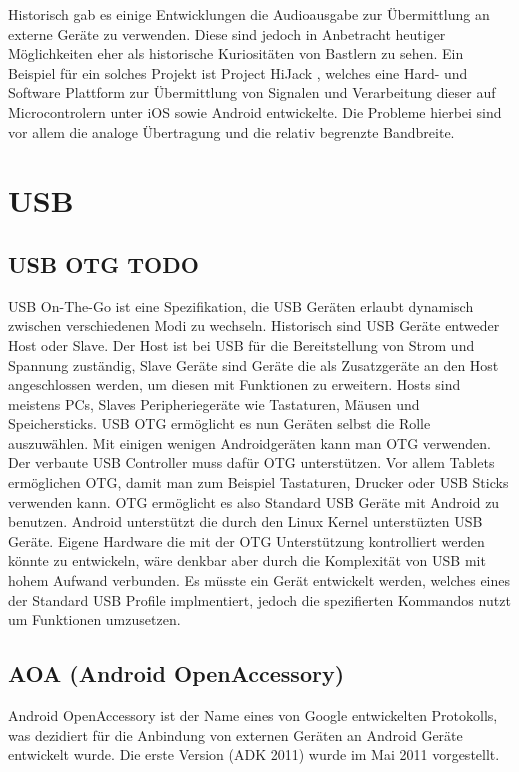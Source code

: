 \documentclass[12pt,journal,compsoc]{IEEEtran}
\begin{document}
Historisch gab es einige Entwicklungen die Audioausgabe zur Übermittlung an externe Geräte zu verwenden. Diese sind jedoch in Anbetracht heutiger Möglichkeiten eher als historische Kuriositäten von Bastlern zu sehen.
Ein Beispiel für ein solches Projekt ist Project HiJack \cite{hijack} , welches eine Hard- und Software Plattform zur Übermittlung von Signalen und Verarbeitung dieser auf Microcontrolern unter iOS sowie Android entwickelte.
Die Probleme hierbei sind vor allem die analoge Übertragung und die relativ begrenzte Bandbreite.

\section{USB}

\subsection{USB OTG TODO}
USB On-The-Go ist eine Spezifikation, die USB Geräten erlaubt dynamisch zwischen verschiedenen Modi zu wechseln. Historisch sind USB Geräte entweder Host oder Slave.
Der Host ist bei USB für die Bereitstellung von Strom und Spannung zuständig, Slave Geräte sind Geräte die als Zusatzgeräte an den Host angeschlossen werden, um diesen mit Funktionen zu erweitern.
Hosts sind meistens PCs, Slaves Peripheriegeräte wie Tastaturen, Mäusen und Speichersticks.
USB OTG ermöglicht es nun Geräten selbst die Rolle auszuwählen.
Mit einigen wenigen Androidgeräten kann man OTG verwenden. Der verbaute USB Controller muss dafür OTG unterstützen.
Vor allem Tablets ermöglichen OTG, damit man zum Beispiel Tastaturen, Drucker oder USB Sticks verwenden kann.
OTG ermöglicht es also Standard USB Geräte mit Android zu benutzen. Android unterstützt die durch den Linux Kernel unterstüzten USB Geräte. Eigene Hardware die mit der OTG Unterstützung kontrolliert werden könnte zu entwickeln, wäre denkbar aber durch die Komplexität von USB mit hohem Aufwand verbunden.
Es müsste ein Gerät entwickelt werden, welches eines der Standard USB Profile implmentiert, jedoch die spezifierten Kommandos nutzt um Funktionen umzusetzen.



\subsection{AOA (Android OpenAccessory)}
Android OpenAccessory ist der Name eines von Google entwickelten Protokolls, was 
dezidiert für die Anbindung von externen Geräten an Android Geräte entwickelt wurde.
Die erste Version (ADK 2011) wurde im Mai 2011 vorgestellt.
\end{document}
